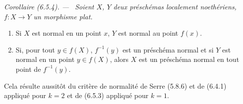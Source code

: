 \documentclass[10pt,oneside]{book}
\newcommand{\oldpage}[2][]{%
  \setcounter{footnote}{0}%
  \marginpar{\scriptsize\textbf{#1}~|~#2}\ignorespaces}
\newenvironment{corollary}[1][]{%
  \par\medskip\noindent\itshape Corollaire (#1). ---\ }{\par}
\begin{document}
\begin{corollary}[6.5.4]
\label{IV.2.s6.5.4-fr}
Soient $X$, $Y$ deux préschémas localement noethériens, $f:X\to Y$
un morphisme plat.
\begin{enumerate}
\item[(i)] Si $X$ est normal en un point $x$, $Y$ est normal au point
$f(x)$.
\item[(ii)] Si, pour tout $y\in f(X)$, $f^{-1}(y)$ est un préschéma
normal et si $Y$ est normal en un point $y\in f(X)$, alors $X$ est un
préschéma normal en tout point de $f^{-1}(y)$.
\end{enumerate}
\end{corollary}

Cela résulte aussitôt du critère de normalité de Serre (5.8.6) et de
(6.4.1) appliqué pour $k=2$ et de (6.5.3) appliqué pour $k=1$.

\oldpage[IV-2]{144}
\end{document}
